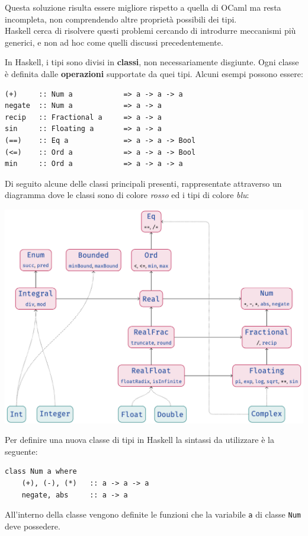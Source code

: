 \documentclass{article}
\begin{document}
Questa soluzione risulta essere migliore rispetto a quella di OCaml ma resta incompleta, non comprendendo altre proprietà possibili dei tipi.\vspace{14pt}\\
Haskell cerca di risolvere questi problemi cercando di introdurre meccanismi più generici, e non ad hoc come quelli discussi precedentemente.

In Haskell, i tipi sono divisi in \textbf{classi}, non necessariamente disgiunte. Ogni classe è definita dalle \textbf{operazioni} supportate da quei tipi. Alcuni esempi possono essere:
\begin{tcolorbox}
\begin{verbatim}
(+)     :: Num a            => a -> a -> a
negate  :: Num a            => a -> a
recip   :: Fractional a     => a -> a
sin     :: Floating a       => a -> a
(==)    :: Eq a             => a -> a -> Bool
(<=)    :: Ord a            => a -> a -> Bool
min     :: Ord a            => a -> a -> a
\end{verbatim}
\end{tcolorbox}

Di seguito alcune delle classi principali presenti, rappresentate attraverso un diagramma dove le classi sono di colore \textit{rosso} ed i tipi di colore \textit{blu}:
\begin{center}
    \includegraphics[width=\textwidth]{img/classes.png}
\end{center}

Per definire una nuova classe di tipi in Haskell la sintassi da utilizzare è la seguente:
\begin{tcolorbox}
\begin{verbatim}
class Num a where
    (+), (-), (*)   :: a -> a -> a
    negate, abs     :: a -> a
\end{verbatim}
\end{tcolorbox}
All'interno della classe vengono definite le funzioni che la variabile \texttt{a} di classe \texttt{Num} deve possedere.
\end{document}
